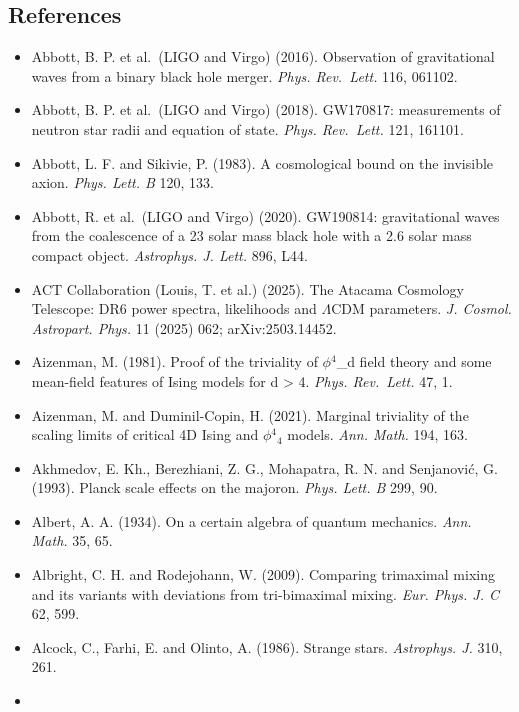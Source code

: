 \documentclass[
  11pt,
]{article}
\providecommand{\tightlist}{%
  \setlength{\itemsep}{0pt}\setlength{\parskip}{0pt}}
\begin{document}
\hypertarget{references}{%
\subsection{References}\label{references}}

\begin{itemize}
\tightlist
\item
  Abbott, B. P. et al.~(LIGO and Virgo) (2016). Observation of gravitational waves from a binary black hole merger. \emph{Phys. Rev.~Lett.} 116, 061102.
\item
  Abbott, B. P. et al.~(LIGO and Virgo) (2018). GW170817: measurements of neutron star radii and equation of state. \emph{Phys. Rev.~Lett.} 121, 161101.
\item
  Abbott, L. F. and Sikivie, P. (1983). A cosmological bound on the invisible axion. \emph{Phys. Lett. B} 120, 133.
\item
  Abbott, R. et al.~(LIGO and Virgo) (2020). GW190814: gravitational waves from the coalescence of a 23 solar mass black hole with a 2.6 solar mass compact object. \emph{Astrophys. J. Lett.} 896, L44.
\item
  ACT Collaboration (Louis, T. et al.) (2025). The Atacama Cosmology Telescope: DR6 power spectra, likelihoods and \ensuremath{\Lambda}CDM parameters. \emph{J. Cosmol. Astropart. Phys.} 11 (2025) 062; arXiv:2503.14452.
\item
  Aizenman, M. (1981). Proof of the triviality of \ensuremath{\phi}\ensuremath{^{4}}\_d field theory and some mean-field features of Ising models for d \textgreater{} 4. \emph{Phys. Rev.~Lett.} 47, 1.
\item
  Aizenman, M. and Duminil-Copin, H. (2021). Marginal triviality of the scaling limits of critical 4D Ising and \ensuremath{\phi}\ensuremath{^{4}}\ensuremath{_{4}} models. \emph{Ann. Math.} 194, 163.
\item
  Akhmedov, E. Kh., Berezhiani, Z. G., Mohapatra, R. N. and Senjanović, G. (1993). Planck scale effects on the majoron. \emph{Phys. Lett. B} 299, 90.
\item
  Albert, A. A. (1934). On a certain algebra of quantum mechanics. \emph{Ann. Math.} 35, 65.
\item
  Albright, C. H. and Rodejohann, W. (2009). Comparing trimaximal mixing and its variants with deviations from tri-bimaximal mixing. \emph{Eur. Phys. J. C} 62, 599.
\item
  Alcock, C., Farhi, E. and Olinto, A. (1986). Strange stars. \emph{Astrophys. J.} 310, 261.
\item

\end{itemize}
\end{document}

